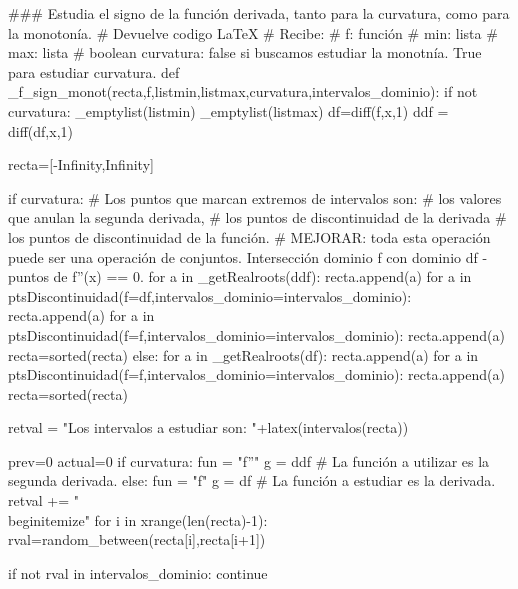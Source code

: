 \begin{sagesilent}
### Estudia el signo de la función derivada, tanto para la curvatura, como para la monotonía.
# Devuelve codigo LaTeX
# Recibe:
# f: función
# min: lista
# max: lista
# boolean curvatura: false si buscamos estudiar la monotnía. True para estudiar curvatura.
def _f_sign_monot(recta,f,listmin,listmax,curvatura,intervalos_dominio):
 if not curvatura:
  _emptylist(listmin)
  _emptylist(listmax)
 df=diff(f,x,1)
 ddf = diff(df,x,1)

 recta=[-Infinity,Infinity]
 

 if curvatura:
    # Los puntos que marcan extremos de intervalos son:
    #       los valores que anulan la segunda derivada, 
    #       los puntos de discontinuidad de la derivada 
    #       los puntos de discontinuidad de la función.
    # MEJORAR: toda esta operación puede ser una operación de conjuntos. Intersección dominio f con dominio df - puntos de f''(x) == 0.
    for a in _getRealroots(ddf):
        recta.append(a)
    for a in ptsDiscontinuidad(f=df,intervalos_dominio=intervalos_dominio):
        recta.append(a)
    for a in ptsDiscontinuidad(f=f,intervalos_dominio=intervalos_dominio):
        recta.append(a)
    recta=sorted(recta) 
 else:
    for a in _getRealroots(df):
        recta.append(a)
    for a in ptsDiscontinuidad(f=f,intervalos_dominio=intervalos_dominio):
        recta.append(a)
    recta=sorted(recta) 
 
 retval = "Los intervalos a estudiar son: "+latex(intervalos(recta))
 
 prev=0
 actual=0
 if curvatura:
    fun = "f''"
    g = ddf # La función a utilizar es la segunda derivada.
 else:
    fun = "f"
    g = df # La función a estudiar es la derivada.
 retval += "\\begin{itemize}"
 for i in xrange(len(recta)-1):
  rval=random_between(recta[i],recta[i+1])

  if not rval in intervalos_dominio:
    continue
  

\end{sagesilent}
